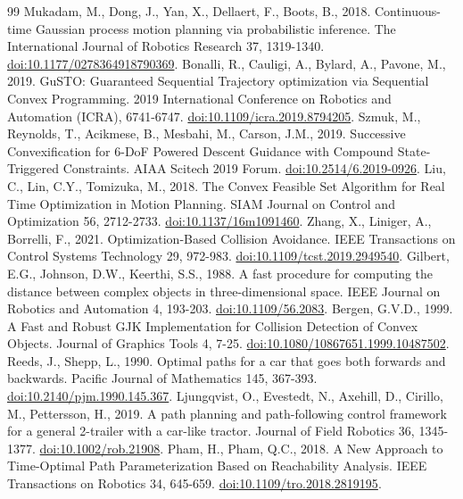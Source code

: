 \begin{thebibliography}{99}
 Mukadam, M., Dong, J., Yan, X., Dellaert, F., Boots, B., 2018. Continuous-time Gaussian process motion planning via probabilistic inference. The International Journal of Robotics Research 37, 1319-1340. \href{https://doi.org/10.1177/0278364918790369}{doi:10.1177/0278364918790369}.
 Bonalli, R., Cauligi, A., Bylard, A., Pavone, M., 2019. GuSTO: Guaranteed Sequential Trajectory optimization via Sequential Convex Programming. 2019 International Conference on Robotics and Automation (ICRA), 6741-6747. \href{https://doi.org/10.1109/icra.2019.8794205}{doi:10.1109/icra.2019.8794205}.
 Szmuk, M., Reynolds, T., Acikmese, B., Mesbahi, M., Carson, J.M., 2019. Successive Convexification for 6-DoF Powered Descent Guidance with Compound State-Triggered Constraints. AIAA Scitech 2019 Forum. \href{https://doi.org/10.2514/6.2019-0926}{doi:10.2514/6.2019-0926}.
 Liu, C., Lin, C.Y., Tomizuka, M., 2018. The Convex Feasible Set Algorithm for Real Time Optimization in Motion Planning. SIAM Journal on Control and Optimization 56, 2712-2733. \href{https://doi.org/10.1137/16m1091460}{doi:10.1137/16m1091460}.
 Zhang, X., Liniger, A., Borrelli, F., 2021. Optimization-Based Collision Avoidance. IEEE Transactions on Control Systems Technology 29, 972-983. \href{https://doi.org/10.1109/tcst.2019.2949540}{doi:10.1109/tcst.2019.2949540}.
 Gilbert, E.G., Johnson, D.W., Keerthi, S.S., 1988. A fast procedure for computing the distance between complex objects in three-dimensional space. IEEE Journal on Robotics and Automation 4, 193-203. \href{https://doi.org/10.1109/56.2083}{doi:10.1109/56.2083}.
 Bergen, G.V.D., 1999. A Fast and Robust GJK Implementation for Collision Detection of Convex Objects. Journal of Graphics Tools 4, 7-25. \href{https://doi.org/10.1080/10867651.1999.10487502}{doi:10.1080/10867651.1999.10487502}.
 Reeds, J., Shepp, L., 1990. Optimal paths for a car that goes both forwards and backwards. Pacific Journal of Mathematics 145, 367-393. \href{https://doi.org/10.2140/pjm.1990.145.367}{doi:10.2140/pjm.1990.145.367}.
 Ljungqvist, O., Evestedt, N., Axehill, D., Cirillo, M., Pettersson, H., 2019. A path planning and path-following control framework for a general 2-trailer with a car-like tractor. Journal of Field Robotics 36, 1345-1377. \href{https://doi.org/10.1002/rob.21908}{doi:10.1002/rob.21908}.
 Pham, H., Pham, Q.C., 2018. A New Approach to Time-Optimal Path Parameterization Based on Reachability Analysis. IEEE Transactions on Robotics 34, 645-659. \href{https://doi.org/10.1109/tro.2018.2819195}{doi:10.1109/tro.2018.2819195}.

\end{thebibliography}
